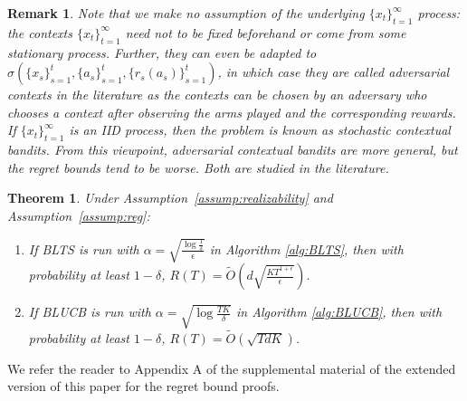 \documentclass[letterpaper]{article} %
\newtheorem{theorem}{Theorem}
\newtheorem{remark}{Remark}
\begin{document}
\begin{remark}
Note that we make no assumption of the underlying $\{x_t\}_{t=1}^{\infty}$ process:
the contexts $\{x_t\}_{t=1}^{\infty}$ need not to be fixed beforehand or come from some stationary process. Further, they can even be adapted to
$\sigma(\{x_s\}_{s=1}^t, \{a_s\}_{s=1}^t, \{r_s(a_s)\}_{s=1}^t)$, in which case they are called adversarial contexts in the literature as the contexts can be chosen by an adversary who chooses a context after observing the arms played and the corresponding rewards.
If $\{x_t\}_{t=1}^{\infty}$ is an IID process, then the problem is known as stochastic contextual bandits. From this viewpoint, adversarial contextual bandits are more general, but the regret bounds tend to be worse. Both are studied in the literature.
\end{remark}

\begin{theorem}\label{thm:main}
Under Assumption~\ref{assump:realizability} and Assumption~\ref{assump:reg}:
\begin{enumerate}
\item 
If BLTS is run with $\alpha = \sqrt{\frac{\log\frac{1}{\delta}}{\epsilon}}$ in Algorithm \ref{alg:BLTS},
then with probability at least $1 - \delta$, 
$R(T) = \tilde{O}\left(d\sqrt{\frac{KT^{1+\epsilon}}{\epsilon}}\right)$.
\item If BLUCB is run with $\alpha = \sqrt{\log \frac{TK}{\delta}}$ in Algorithm \ref{alg:BLUCB},
then with probability at least $1 - \delta$, 
$R(T) = \tilde{O}\left(\sqrt{TdK}\right)$.
\end{enumerate}
\end{theorem}
\noindent We refer the reader to Appendix A of the supplemental material of the extended version of this paper \cite{dimakopoulou2017estimation} for the regret bound proofs.
\end{document}
